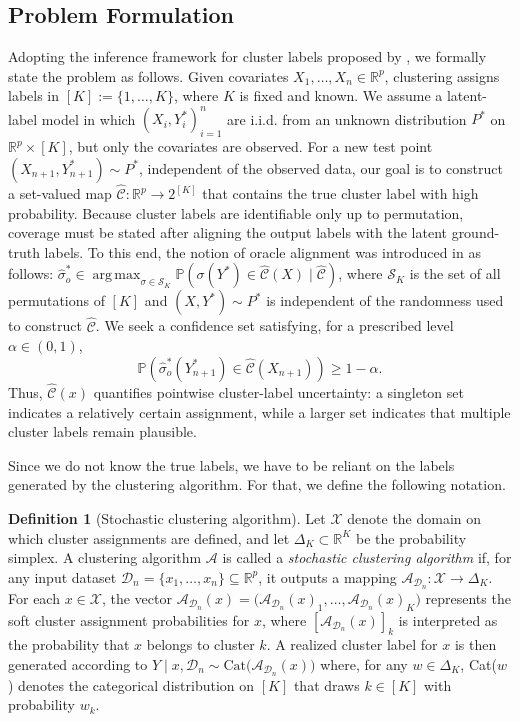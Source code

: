 \documentclass[11pt,letterpaper]{article}
\theoremstyle{definition}
\newtheorem{definition}{Definition}
\newcommand{\cC}{\mathcal{C}}
\newcommand{\cD}{\mathcal{D}}
\newcommand{\cS}{\mathcal{S}}
\newcommand{\R}{\mathbb{R}}
\renewcommand{\P}{\mathbb{P}}
\DeclareMathOperator*{\argmax}{arg\,max} %
\begin{document}
\subsection{Problem Formulation}
\label{sec:problem_formulation}
Adopting the inference framework for cluster labels proposed by \cite{hur2026inference}, we formally state the problem as follows. Given covariates \(X_1, \ldots, X_n \in \R^p\), clustering assigns labels in \([K] := \{1, \ldots, K\}\), where \(K\) is fixed and known. We assume a latent-label model in which \((X_i, Y_i^\ast)_{i = 1}^n\) are i.i.d. from an unknown distribution $P^\ast$ on $\R^p\times[K]$, but only the covariates are observed. For a new test point $(X_{n+1},Y_{n+1}^\ast)\sim P^\ast$, independent of the observed data, our goal is to construct a set-valued map $\hat{\cC} \colon \R^p \to 2^{[K]}$ that contains the true cluster label with high probability. Because cluster labels are identifiable only up to permutation, coverage must be stated after aligning the output labels with the latent ground-truth labels. To this end, the notion of oracle alignment was introduced in \cite{hur2026inference} as follows: $\hat{\sigma}_o^\ast \in \argmax_{\sigma\in\cS_K}
\P(\sigma(Y^\ast)\in \hat{\cC}(X)\mid \hat{\cC})$, where $\cS_K$ is the set of all permutations of $[K]$ and $(X,Y^\ast)\sim P^\ast$ is independent of the randomness used to construct $\hat{\cC}$. We seek a confidence set satisfying, for a prescribed level $\alpha\in(0,1)$,
\begin{equation}
    \label{eq:target_coverage_bound}
    \P\left(\hat{\sigma}_o^\ast(Y_{n+1}^\ast)\in \hat{\cC}(X_{n+1})\right)\ge 1-\alpha.
\end{equation}
Thus, $\hat{\cC}(x)$ quantifies pointwise cluster-label uncertainty: a singleton set indicates a relatively certain assignment, while a larger set indicates that multiple cluster labels remain plausible.

Since we do not know the true labels, we have to be reliant on the labels generated by the clustering algorithm. For that, we define the following notation. 

\begin{definition}[Stochastic clustering algorithm]
    \label{def:stochastic_clustering}
    Let $\mathcal{X}$ denote the domain on which cluster assignments are defined, and let $\Delta_K \subset \R^K$ be the probability simplex. A clustering algorithm $\mathcal{A}$ is called a \emph{stochastic clustering algorithm} if, for any input dataset $\cD_n = \{x_1,\dots,x_n\} \subseteq \R^p$, it outputs a mapping $\mathcal{A}_{\cD_n} : \mathcal{X} \to \Delta_K$. For each $x \in \mathcal{X}$, the vector $\mathcal{A}_{\cD_n}(x) = \bigl(\mathcal{A}_{\cD_n}(x)_1,\dots,\mathcal{A}_{\cD_n}(x)_K\bigr)$ represents the soft cluster assignment probabilities for $x$, where $[\mathcal{A}_{\cD_n}(x)]_k$ is interpreted as the probability that $x$ belongs to cluster $k$. A realized cluster label for $x$ is then generated according to $Y \mid x,\cD_n \sim \mathrm{Cat}\bigl(\mathcal{A}_{\cD_n}(x)\bigr)$ where, for any $w \in \Delta_K$, Cat($w$) denotes the categorical distribution on $[K]$ that draws $k \in [K]$ with probability $w_k$.
\end{definition}
\end{document}
